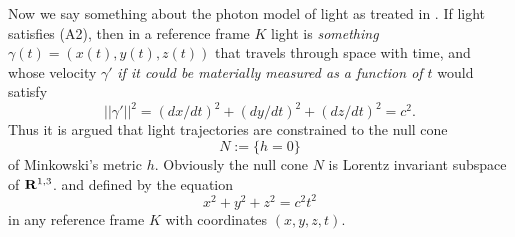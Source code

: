 \documentclass[12pt]{amsart}
\newcommand{\del}{\partial}
\begin{document}










Now we say something about the photon model of light as treated in \cite[III.XI.6, pp.301]{levi}. If light satisfies (A2), then in a reference frame $K$ light is \emph{something} $\gamma(t)=(x(t),y(t),z(t))$ that travels through space with time, and whose velocity $\gamma'$ \emph{if it could be materially measured as a function of $t$} would satisfy \begin{equation}\label{vel} 
||\gamma'||^2=(dx/dt)^2+(dy/dt)^2+(dz/dt)^2=c^2.
\end{equation} Thus it is argued that light trajectories are constrained to the null cone $$N:=\{h=0\}$$ of Minkowski's metric $h$. Obviously the null cone $N$ is Lorentz invariant subspace of ${\bf{R}}^{1,3}$. and defined by the equation $$x^2+y^2+z^2=c^2 t^2$$ in any reference frame $K$ with coordinates $(x,y,z,t)$.   


\end{document}
